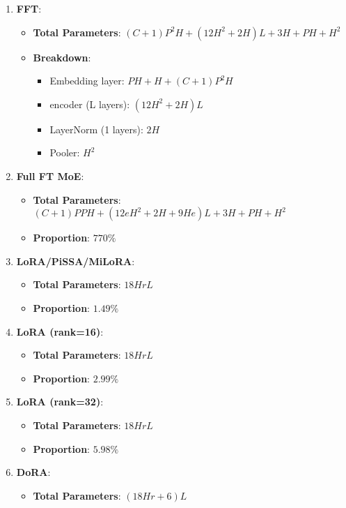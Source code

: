 \begin{enumerate}
    \item \textbf{FFT}:
    \begin{itemize}
        \item \textbf{Total Parameters}: \( (C+1)P^2H + (12H^2 + 2H)L + 3H + PH + H^2 \)
        \item \textbf{Breakdown}:
        \begin{itemize}
            \item Embedding layer: \( PH+H+(C+1)P^2H \)
            \item encoder (L layers): \( (12H^2+2H)L \)
            \item LayerNorm (1 layers): \( 2H \)
            \item Pooler: \( H^2 \)
        \end{itemize}
    \end{itemize}
    \item \textbf{Full FT MoE}:
    \begin{itemize}
        \item \textbf{Total Parameters}: \( (C+1)PPH + (12eH^2 + 2H + 9He)L + 3H + PH + H^2 \)
        \item \textbf{Proportion}: \( 770\% \)
    \end{itemize}
    \item \textbf{LoRA/PiSSA/MiLoRA}:
    \begin{itemize}
        \item \textbf{Total Parameters}: \( 18HrL \)
        \item \textbf{Proportion}: \( 1.49\% \)
    \end{itemize}
    \item \textbf{LoRA (rank=16)}:
    \begin{itemize}
        \item \textbf{Total Parameters}: \( 18HrL \)
        \item \textbf{Proportion}: \( 2.99\% \)
    \end{itemize}
    \item \textbf{LoRA (rank=32)}:
    \begin{itemize}
        \item \textbf{Total Parameters}: \( 18HrL \)
        \item \textbf{Proportion}: \( 5.98\% \)
    \end{itemize}
    \item \textbf{DoRA}:
    \begin{itemize}
        \item \textbf{Total Parameters}: \( (18Hr + 6)L \)

\end{itemize}
\end{enumerate}
